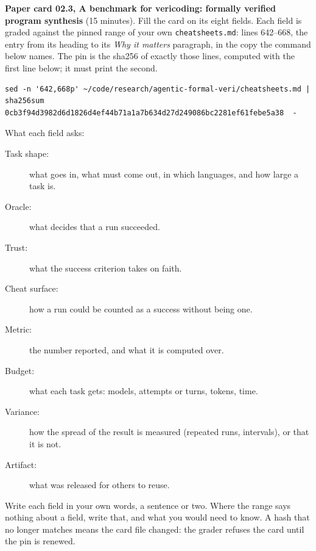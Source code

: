 \documentclass[11pt]{article}
\begin{document}
\begin{problem}\label{prob:B1}
\textbf{Paper card 02.3, A benchmark for vericoding: formally verified program
synthesis} (15 minutes). Fill the card on its eight fields. Each field is
graded against the pinned range of your own \texttt{cheatsheets.md}: lines
642--668, the entry from its heading to its \emph{Why it matters} paragraph, in
the copy the command below names. The pin is the sha256 of exactly those
lines, computed with the first line below; it must print the second.
{\small
\begin{verbatim}
sed -n '642,668p' ~/code/research/agentic-formal-veri/cheatsheets.md | sha256sum
0cb3f94d3982d6d1826d4ef44b71a1a7b634d27d249086bc2281ef61febe5a38  -
\end{verbatim}
}
What each field asks:
\begin{description}
\item[Task shape:] what goes in, what must come out, in which languages, and
  how large a task is.
\item[Oracle:] what decides that a run succeeded.
\item[Trust:] what the success criterion takes on faith.
\item[Cheat surface:] how a run could be counted as a success without being
  one.
\item[Metric:] the number reported, and what it is computed over.
\item[Budget:] what each task gets: models, attempts or turns, tokens, time.
\item[Variance:] how the spread of the result is measured (repeated runs,
  intervals), or that it is not.
\item[Artifact:] what was released for others to reuse.
\end{description}
Write each field in your own words, a sentence or two. Where the range says
nothing about a field, write that, and what you would need to know. A hash
that no longer matches means the card file changed: the grader refuses the
card until the pin is renewed.
\end{problem}
\end{document}
